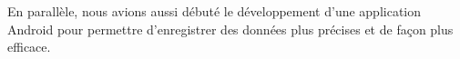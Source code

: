 
En parallèle, nous avions aussi débuté le développement d'une application Android pour permettre d'enregistrer des données plus précises et de façon plus efficace.